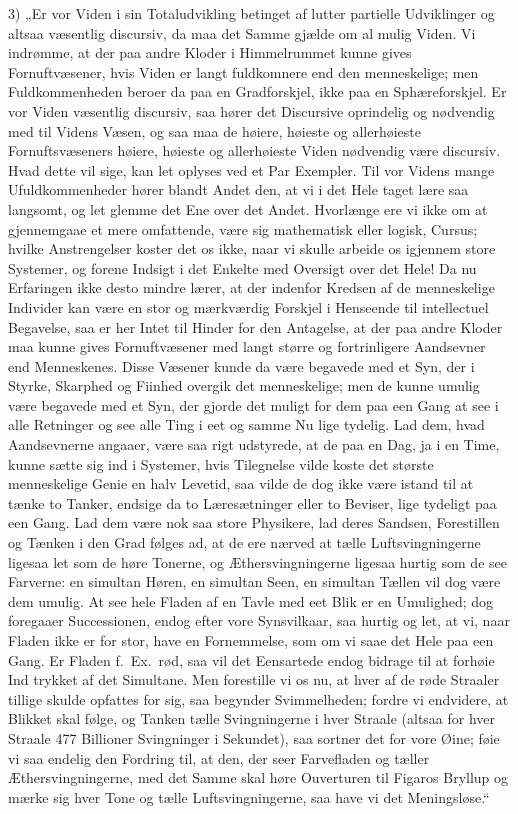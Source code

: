 \documentclass[12pt]{book}
\newcommand{\opage}[1]{\marginnote{\footnotesize\textit{[#1]}}}
\begin{document}
\opage{247} 3) „Er vor Viden i sin Totaludvikling betinget af lutter partielle Udviklinger og altsaa væsentlig
discursiv, da maa det Samme gjælde om al mulig Viden. Vi indrømme, at der paa andre Kloder i
Himmelrummet kunne gives Fornuftvæsener, hvis Viden er langt fuldkomnere end den menneskelige; men
Fuldkommenheden beroer da paa en Gradforskjel, ikke paa en Sphæreforskjel. Er vor Viden væsentlig
discursiv, saa hører det Discursive oprindelig og nødvendig med til Videns Væsen, og saa maa de
høiere, høieste og allerhøieste Fornuftsvæseners høiere, høieste og allerhøieste Viden nødvendig
være discursiv. Hvad dette vil sige, kan let oplyses
\opage{248} ved et Par Exempler. Til vor Videns mange Ufuldkommenheder hører blandt Andet den, at vi i det Hele
taget lære saa langsomt, og let glemme det Ene over det Andet. Hvorlænge ere vi ikke om at
gjennemgaae et mere omfattende, være sig mathematisk eller logisk, Cursus; hvilke Anstrengelser
koster det os ikke, naar vi skulle arbeide os igjennem store Systemer, og forene Indsigt i det
Enkelte med Oversigt over det Hele! Da nu Erfaringen ikke desto mindre lærer, at der indenfor
Kredsen af de menneskelige Individer kan være en stor og mærkværdig Forskjel i Henseende til
intellectuel Begavelse, saa er her Intet til Hinder for den Antagelse, at der paa andre Kloder maa
kunne gives Fornuftvæsener med langt større og fortrinligere Aandsevner end Menneskenes. Disse
Væsener kunde da være begavede med et Syn, der i Styrke, Skarphed og Fiinhed overgik det
menneskelige; men de kunne umulig være begavede med et Syn, der gjorde det muligt for dem paa een
Gang at see i alle Retninger og see alle Ting i eet og samme Nu lige tydelig. Lad dem, hvad
Aandsevnerne angaaer, være saa rigt udstyrede, at de paa en Dag, ja i en Time, kunne sætte sig ind i
Systemer, hvis Tilegnelse vilde koste det største menneskelige Genie en halv Levetid, saa vilde de
dog ikke være istand til at tænke to Tanker, endsige da to Læresætninger eller to Beviser, lige
tydeligt paa een Gang. Lad dem være nok saa store Physikere, lad deres Sandsen, Forestillen og
Tænken i den Grad følges ad, at de ere nærved at tælle Luftsvingningerne ligesaa let som de høre
Tonerne, og Æthersvingningerne ligesaa hurtig som de see Farverne: en simultan Høren, en simultan
Seen, en simultan Tællen vil dog være dem umulig. At see hele Fladen af en Tavle med eet Blik er en
Umulighed; dog foregaaer Successionen, endog efter vore Synsvilkaar, saa hurtig og let, at vi, naar
Fladen ikke er for stor, have en Fornemmelse, som om vi saae det Hele paa een Gang. Er Fladen f.\
Ex.\ rød, saa vil det Eensartede endog bidrage til at forhøie Ind%
\opage{249} trykket af det Simultane. Men forestille vi os nu, at hver af de røde Straaler tillige skulde
opfattes for sig, saa begynder Svimmelheden; fordre vi endvidere, at Blikket skal følge, og Tanken
tælle Svingningerne i hver Straale (altsaa for hver Straale 477 Billioner Svingninger i Sekundet),
saa sortner det for vore Øine; føie vi saa endelig den Fordring til, at den, der seer Farvefladen og
tæller Æthersvingningerne, med det Samme skal høre Ouverturen til Figaros Bryllup og mærke sig hver
Tone og tælle Luftsvingningerne, saa have vi det Meningsløse.“
\end{document}
